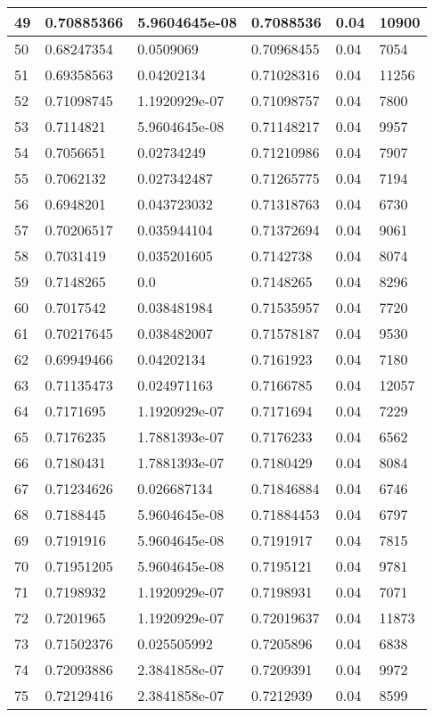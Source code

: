 \begin{longtable}{|l|l|l|l|l|l|}
49 & 0.70885366 & 5.9604645e-08 & 0.7088536 & 0.04 & 10900 \\ \hline 
50 & 0.68247354 & 0.0509069 & 0.70968455 & 0.04 & 7054 \\ \hline 
51 & 0.69358563 & 0.04202134 & 0.71028316 & 0.04 & 11256 \\ \hline 
52 & 0.71098745 & 1.1920929e-07 & 0.71098757 & 0.04 & 7800 \\ \hline 
53 & 0.7114821 & 5.9604645e-08 & 0.71148217 & 0.04 & 9957 \\ \hline 
54 & 0.7056651 & 0.02734249 & 0.71210986 & 0.04 & 7907 \\ \hline 
55 & 0.7062132 & 0.027342487 & 0.71265775 & 0.04 & 7194 \\ \hline 
56 & 0.6948201 & 0.043723032 & 0.71318763 & 0.04 & 6730 \\ \hline 
57 & 0.70206517 & 0.035944104 & 0.71372694 & 0.04 & 9061 \\ \hline 
58 & 0.7031419 & 0.035201605 & 0.7142738 & 0.04 & 8074 \\ \hline 
59 & 0.7148265 & 0.0 & 0.7148265 & 0.04 & 8296 \\ \hline 
60 & 0.7017542 & 0.038481984 & 0.71535957 & 0.04 & 7720 \\ \hline 
61 & 0.70217645 & 0.038482007 & 0.71578187 & 0.04 & 9530 \\ \hline 
62 & 0.69949466 & 0.04202134 & 0.7161923 & 0.04 & 7180 \\ \hline 
63 & 0.71135473 & 0.024971163 & 0.7166785 & 0.04 & 12057 \\ \hline 
64 & 0.7171695 & 1.1920929e-07 & 0.7171694 & 0.04 & 7229 \\ \hline 
65 & 0.7176235 & 1.7881393e-07 & 0.7176233 & 0.04 & 6562 \\ \hline 
66 & 0.7180431 & 1.7881393e-07 & 0.7180429 & 0.04 & 8084 \\ \hline 
67 & 0.71234626 & 0.026687134 & 0.71846884 & 0.04 & 6746 \\ \hline 
68 & 0.7188445 & 5.9604645e-08 & 0.71884453 & 0.04 & 6797 \\ \hline 
69 & 0.7191916 & 5.9604645e-08 & 0.7191917 & 0.04 & 7815 \\ \hline 
70 & 0.71951205 & 5.9604645e-08 & 0.7195121 & 0.04 & 9781 \\ \hline 
71 & 0.7198932 & 1.1920929e-07 & 0.7198931 & 0.04 & 7071 \\ \hline 
72 & 0.7201965 & 1.1920929e-07 & 0.72019637 & 0.04 & 11873 \\ \hline 
73 & 0.71502376 & 0.025505992 & 0.7205896 & 0.04 & 6838 \\ \hline 
74 & 0.72093886 & 2.3841858e-07 & 0.7209391 & 0.04 & 9972 \\ \hline 
75 & 0.72129416 & 2.3841858e-07 & 0.7212939 & 0.04 & 8599 \\ \hline 
\end{longtable}